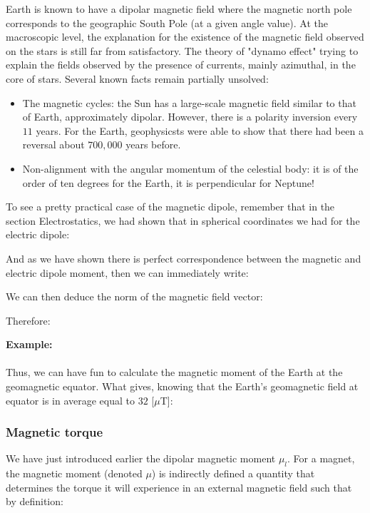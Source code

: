 	\begin{tcolorbox}[title=Remark,colframe=black,arc=10pt]
	Earth is known to have a dipolar magnetic field where the magnetic north pole corresponds to the geographic South Pole (at a given angle value). At the macroscopic level, the explanation for the existence of the magnetic field observed on the stars is still far from satisfactory. The theory of "dynamo effect" trying to explain the fields observed by the presence of currents, mainly azimuthal, in the core of stars. Several known facts remain partially unsolved:
	\begin{itemize}
		\item The magnetic cycles: the Sun has a large-scale magnetic field similar to that of Earth, approximately dipolar. However, there is a polarity inversion every $11$ years. For the Earth, geophysicsts were able to show that there had been a reversal about $700,000$ years before.
		
		\item Non-alignment with the angular momentum of the celestial body: it is of the order of ten degrees for the Earth, it is perpendicular for Neptune!
	\end{itemize}
	\end{tcolorbox}
	To see a pretty practical case of the magnetic dipole, remember that in the section Electrostatics, we had shown that in spherical coordinates we had for the electric dipole:
	
	And as we have shown there is perfect correspondence between the magnetic and electric dipole moment, then we can immediately write:
	
	We can then deduce the norm of the magnetic field vector:
	
	Therefore:
	
	
	\begin{tcolorbox}[colframe=black,colback=white,sharp corners]
	\textbf{{\Large {}}Example:}\\\\
	Thus, we can have fun to calculate the magnetic moment of the Earth at the geomagnetic equator. What gives, knowing that the Earth's geomagnetic field  at equator is in average equal to $32$ [$\mu$T]:
	
	\end{tcolorbox}
	
		\subsubsection{Magnetic torque}
	We have just introduced earlier the dipolar magnetic moment $\mu_l$. For a magnet, the magnetic moment (denoted $\mu$) is indirectly defined a quantity that determines the torque it will experience in an external magnetic field such that by definition:
	
